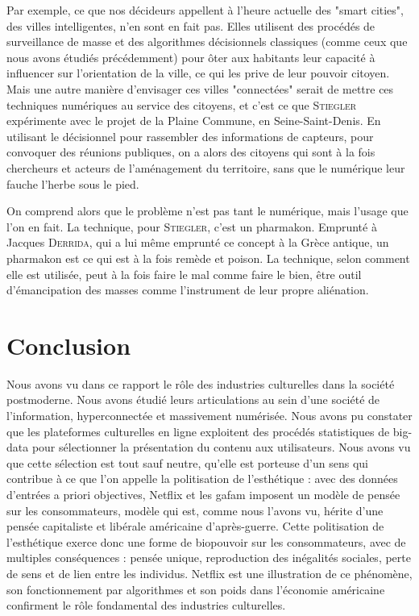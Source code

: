 \documentclass[a4paper,14pt]{extreport}
\begin{document}
Par exemple, ce que nos décideurs appellent à l'heure actuelle des "smart cities", des villes intelligentes, n'en sont en fait pas. Elles utilisent des procédés de surveillance de masse et des algorithmes décisionnels classiques (comme ceux que nous avons étudiés précédemment) pour ôter aux habitants leur capacité à influencer sur l'orientation de la ville, ce qui les prive de leur pouvoir citoyen. Mais une autre manière d'envisager ces villes "connectées" serait de mettre ces techniques numériques au service des citoyens, et c'est ce que \textsc{Stiegler} expérimente avec le projet de la Plaine Commune, en Seine-Saint-Denis. En utilisant le décisionnel pour rassembler des informations de capteurs, pour convoquer des réunions publiques, on a alors des citoyens qui sont à la fois chercheurs et acteurs de l'aménagement du territoire, sans que le numérique leur fauche l'herbe sous le pied.

On comprend alors que le problème n'est pas tant le numérique, mais l'usage que l'on en fait. La technique, pour \textsc{Stiegler}, c'est un pharmakon. Emprunté à Jacques \textsc{Derrida}, qui a lui même emprunté ce concept à la Grèce antique, un pharmakon est ce qui est à la fois remède et poison. La technique, selon comment elle est utilisée, peut à la fois faire le mal comme faire le bien, être outil d'émancipation des masses comme l'instrument de leur propre aliénation.

\chapter*{Conclusion}

Nous avons vu dans ce rapport le rôle des industries culturelles dans la société postmoderne. Nous avons étudié leurs articulations au sein d'une société de l'information, hyperconnectée et massivement numérisée. Nous avons pu constater que les plateformes culturelles en ligne exploitent des procédés statistiques de \gls{big-data} pour sélectionner la présentation du contenu aux utilisateurs. Nous avons vu que cette sélection est tout sauf neutre, qu'elle est porteuse d'un sens qui contribue à ce que l'on appelle la politisation de l'esthétique : avec des données d'entrées a priori objectives, Netflix et les \gls{gafam} imposent un modèle de pensée sur les consommateurs, modèle qui est, comme nous l'avons vu, hérite d'une pensée capitaliste et libérale américaine d'après-guerre. Cette politisation de l'esthétique exerce donc une forme de biopouvoir sur les consommateurs, avec de multiples conséquences : pensée unique, reproduction des inégalités sociales, perte de sens et de lien entre les individus. Netflix est une illustration de ce phénomène, son fonctionnement par algorithmes et son poids dans l'économie américaine confirment le rôle fondamental des industries culturelles.
\end{document}
